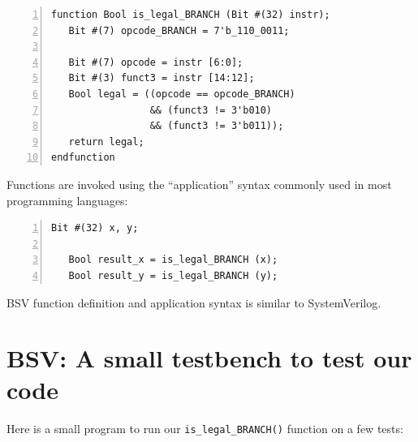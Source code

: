 \begin{Verbatim}[frame=single, numbers=left]
function Bool is_legal_BRANCH (Bit #(32) instr);
   Bit #(7) opcode_BRANCH = 7'b_110_0011;

   Bit #(7) opcode = instr [6:0];
   Bit #(3) funct3 = instr [14:12];
   Bool legal = ((opcode == opcode_BRANCH)
                 && (funct3 != 3'b010)
                 && (funct3 != 3'b011));
   return legal;
endfunction
\end{Verbatim}


Functions are invoked using the ``application'' syntax commonly used
in most programming languages:

\begin{Verbatim}[frame=single, numbers=left]
   Bit #(32) x, y;

   Bool result_x = is_legal_BRANCH (x);
   Bool result_y = is_legal_BRANCH (y);
\end{Verbatim}

BSV function definition and application syntax is similar to
SystemVerilog.


\section{BSV: A small testbench to test our code}

\label{BSV_small_testbench}


Here is a small program to run our \verb|is_legal_BRANCH()| function on
a few tests:

